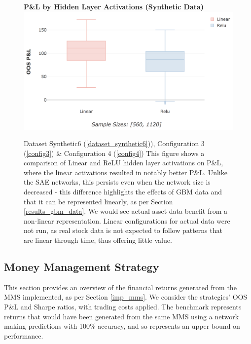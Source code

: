 \documentclass[a4paper,11pt,oneside]{article}
\theoremstyle{plain}
\theoremstyle{definition}
\begin{document}
	\begin{figure}[H]
		\centering
		\textbf{P\&L by Hidden Layer Activations (Synthetic Data)}
		\includegraphics[scale=0.35]{images/results/8_7_network/synth_pl_hidden.png}
		\caption[P\&L by Hidden Layer Activations (Synthetic Data)]
		{Dataset Synthetic6  (\ref{dataset_synthetic6})), Configuration 3 (\ref{config3}) \& Configuration 4 (\ref{config4})
			\newline This figure shows a comparison of Linear and ReLU hidden layer activations on P\&L, where the linear activations resulted in notably better P\&L. Unlike the SAE networks, this persists even when the network size is decreased - this difference highlights the effects of GBM data and that it can be represented linearly, as per Section \ref{results_gbm_data}. We would see actual asset data benefit from a non-linear representation. Linear configurations for actual data were not run, as real stock data is not expected to follow patterns that are linear through time, thus offering little value.}
		\label{figure-synth_pl_hidden}
	\end{figure}
	
	
	
	\newpage
	\subsection{Money Management Strategy}\label{results_mms}
	
	This section provides an overview of the financial returns generated from the MMS implemented, as per Section \ref{imp_mms}. We consider the strategies' OOS P\&L and Sharpe ratios, with trading costs applied. The benchmark represents returns that would have been generated from the same MMS using a network making predictions with 100\% accuracy, and so represents an upper bound on performance.\newline
	
\end{document}
